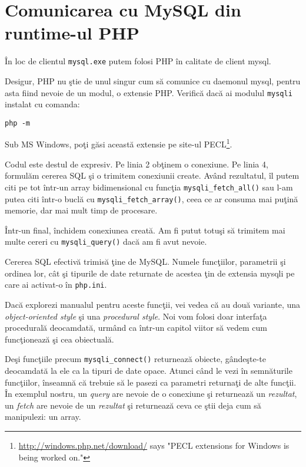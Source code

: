 \section{Comunicarea cu MySQL din runtime-ul PHP}
În loc de clientul \texttt{mysql.exe} putem folosi PHP în
calitate de client mysql. 

Desigur, PHP nu ştie de unul singur cum să comunice cu daemonul mysql,
pentru asta fiind nevoie de un modul, o extensie PHP.
Verifică dacă ai modulul \texttt{mysqli} instalat cu comanda:
\begin{verbatim}
php -m
\end{verbatim}
Sub MS Windows, poţi găsi această extensie pe site-ul
PECL\footnote{\url{http://windows.php.net/download/} says
"PECL extensions for Windows is being worked on."
}.



Codul este destul de expresiv. Pe linia 2 obţinem o conexiune.
Pe linia 4, formulăm cererea SQL şi o trimitem conexiunii create.
Având rezultatul, îl putem citi pe tot într-un array bidimensional
cu funcţia \texttt{mysqli\_fetch\_all()} sau l-am putea citi într-o
buclă cu \texttt{mysqli\_fetch\_array()}, ceea ce ar consuma
mai puţină memorie, dar mai mult timp de procesare.

Într-un final, închidem conexiunea creată. Am fi putut totuşi să
trimitem mai multe cereri cu \texttt{mysqli\_query()} dacă am fi
avut nevoie.

Cererea SQL efectivă trimisă ţine de MySQL. Numele funcţiilor,
parametrii şi ordinea lor, cât şi tipurile de date returnate de
acestea ţin de extensia mysqli pe care ai activat-o în \texttt{php.ini}.

Dacă explorezi manualul pentru aceste funcţii, vei vedea că au
două variante, una \textit{object-oriented style} şi una
\textit{procedural style}. Noi vom folosi doar interfaţa procedurală
deocamdată, urmând ca într-un
capitol viitor să vedem cum funcţionează şi cea obiectuală.

Deşi funcţiile precum \texttt{mysqli\_connect()} returnează obiecte,
gândeşte-te deocamdată la ele ca la tipuri de date opace.
Atunci când le vezi în semnăturile funcţiilor, înseamnă că trebuie
să le pasezi ca parametri returnaţi de alte funcţii. În exemplul
nostru, un \textit{query} are nevoie de o conexiune şi returnează
un \textit{rezultat}, un \textit{fetch} are nevoie de un \textit{rezultat}
şi returnează ceva ce ştii deja cum să manipulezi: un array.

